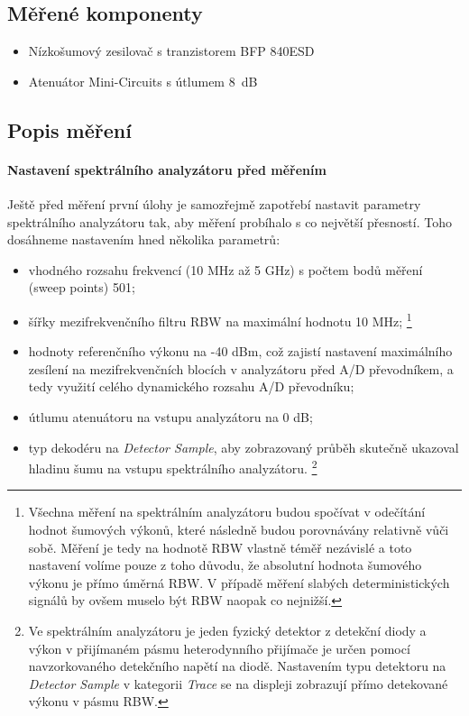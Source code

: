 \documentclass[11pt,a4paper]{article}
\begin{document}
\subsection*{Měřené komponenty}
\begin{itemize}
    \item Nízkošumový zesilovač s tranzistorem BFP 840ESD
    \item Atenuátor Mini-Circuits s útlumem 8~dB
\end{itemize}

\subsection*{Popis měření}
\paragraph*{Nastavení spektrálního analyzátoru před měřením} Ještě před měření první úlohy je samozřejmě zapotřebí nastavit parametry spektrálního analyzátoru tak, aby měření probíhalo s co největší přesností. Toho dosáhneme nastavením hned několika parametrů:
\begin{itemize}
    \item vhodného rozsahu frekvencí (10 MHz až 5 GHz) s počtem bodů měření (sweep points) 501;
    \item šířky mezifrekvenčního filtru RBW na maximální hodnotu 10 MHz;%
    \footnote{Všechna měření na spektrálním analyzátoru budou spočívat v odečítání hodnot šumových výkonů, které následně budou porovnávány relativně vůči sobě. Měření je tedy na hodnotě RBW vlastně téměř nezávislé a toto nastavení volíme pouze z toho důvodu, že absolutní hodnota šumového výkonu je přímo úměrná RBW. V případě měření slabých deterministických signálů by ovšem muselo být RBW naopak co nejnižší.}
    \item hodnoty referenčního výkonu na -40 dBm, což zajistí nastavení maximálního zesílení na mezifrekvenčních blocích v analyzátoru před A/D převodníkem, a tedy využití celého dynamického rozsahu A/D převodníku;
    \item útlumu atenuátoru na vstupu analyzátoru na 0 dB;
    \item typ dekodéru na \emph{Detector Sample},
    aby zobrazovaný průběh skutečně ukazoval hladinu šumu na vstupu spektrálního analyzátoru.%
        \footnote{Ve spektrálním analyzátoru je jeden fyzický detektor z detekční diody a výkon v přijímaném pásmu heterodynního přijímače je určen pomocí navzorkovaného detekčního napětí na diodě. Nastavením typu detektoru na \emph{Detector Sample} v kategorii \emph{Trace} se na displeji zobrazují přímo detekované výkonu v pásmu RBW.}
\end{itemize}
\end{document}
